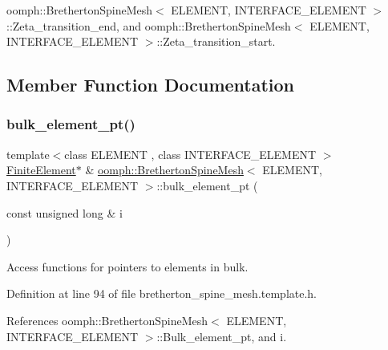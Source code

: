 oomph\+::\+Bretherton\+Spine\+Mesh$<$ E\+L\+E\+M\+E\+N\+T, I\+N\+T\+E\+R\+F\+A\+C\+E\+\_\+\+E\+L\+E\+M\+E\+N\+T $>$\+::\+Zeta\+\_\+transition\+\_\+end, and oomph\+::\+Bretherton\+Spine\+Mesh$<$ E\+L\+E\+M\+E\+N\+T, I\+N\+T\+E\+R\+F\+A\+C\+E\+\_\+\+E\+L\+E\+M\+E\+N\+T $>$\+::\+Zeta\+\_\+transition\+\_\+start.



\subsection{Member Function Documentation}
\mbox{\label{classoomph_1_1BrethertonSpineMesh_a2fc2b4be08ff93fa313281f82e19d92e}} 
\subsubsection{\texorpdfstring{bulk\+\_\+element\+\_\+pt()}{bulk\_element\_pt()}}
{\footnotesize\ttfamily template$<$class E\+L\+E\+M\+E\+NT , class I\+N\+T\+E\+R\+F\+A\+C\+E\+\_\+\+E\+L\+E\+M\+E\+NT $>$ \\
\hyperlink{classoomph_1_1FiniteElement}{Finite\+Element}$\ast$ \& \hyperlink{classoomph_1_1BrethertonSpineMesh}{oomph\+::\+Bretherton\+Spine\+Mesh}$<$ E\+L\+E\+M\+E\+NT, I\+N\+T\+E\+R\+F\+A\+C\+E\+\_\+\+E\+L\+E\+M\+E\+NT $>$\+::bulk\+\_\+element\+\_\+pt (\begin{DoxyParamCaption}\item[{const unsigned long \&}]{i }\end{DoxyParamCaption})\hspace{0.3cm}{\ttfamily [inline]}}



Access functions for pointers to elements in bulk. 



Definition at line 94 of file bretherton\+\_\+spine\+\_\+mesh.\+template.\+h.



References oomph\+::\+Bretherton\+Spine\+Mesh$<$ E\+L\+E\+M\+E\+N\+T, I\+N\+T\+E\+R\+F\+A\+C\+E\+\_\+\+E\+L\+E\+M\+E\+N\+T $>$\+::\+Bulk\+\_\+element\+\_\+pt, and i.

\mbox{\label{classoomph_1_1BrethertonSpineMesh_a9b02893724c76098f75d9285e9985f4b}} 
